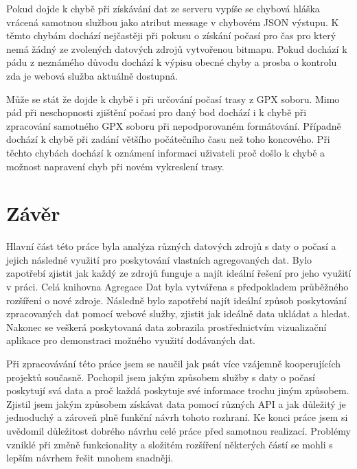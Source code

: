 \documentclass[czech,bachelor,dept460,male,csharp,cpdeclaration]{diploma}
\begin{document}
	Pokud dojde k chybě při získávání dat ze serveru vypíše se chybová hláška vrácená samotnou službou jako atribut message v chybovém JSON výstupu. K těmto chybám dochází nejčastěji při pokusu o získání počasí pro čas pro který nemá žádný ze zvolených datových zdrojů vytvořenou bitmapu. Pokud dochází k pádu z neznámého důvodu dochází k výpisu obecné chyby a prosba o kontrolu zda je webová služba aktuálně dostupná.
	
	Může se stát že dojde k chybě i při určování počasí trasy z GPX soboru. Mimo pád při neschopnosti zjištění počasí pro daný bod dochází i k chybě při zpracování samotného GPX soboru při nepodporovaném formátování. Případně dochází k chybě při zadání většího počátečního času než toho koncového. Při těchto chybách dochází k oznámení informaci uživateli proč došlo k chybě a možnost napravení chyb při novém vykreslení trasy.
	
	\chapter{Závěr}
	
	Hlavní část této práce byla analýza různých datových zdrojů s daty o počasí a jejich následné využití pro poskytování vlastních agregovaných dat. Bylo zapotřebí zjistit jak každý ze zdrojů funguje a najít ideální řešení pro jeho využití v práci. Celá knihovna Agregace Dat byla vytvářena s předpokladem průběžného rozšíření o nové zdroje. Následně bylo zapotřebí najít ideální způsob poskytování zpracovaných dat pomocí webové služby, zjistit jak ideálně data ukládat a hledat. Nakonec se veškerá poskytovaná data zobrazila prostřednictvím vizualizační aplikace pro demonstraci možného využití dodávaných dat.
	
	Při zpracovávání této práce jsem se naučil jak psát více vzájemně kooperujících projektů současně. Pochopil jsem jakým způsobem služby s daty o počasí poskytují svá data a proč každá poskytuje své informace trochu jiným způsobem. Zjistil jsem jakým způsobem získávat data pomocí různých API a jak důležitý je jednoduchý a zároveň plně funkční návrh tohoto rozhraní. Ke konci práce jsem si uvědomil důležitost dobrého návrhu celé práce před samotnou realizací. Problémy vzniklé při změně funkcionality a složitém rozšíření některých částí se mohli s lepším návrhem řešit mnohem snadněji.
	
	\printbibliography[title={Literatura}, heading=bibintoc]
	
	
\end{document}
